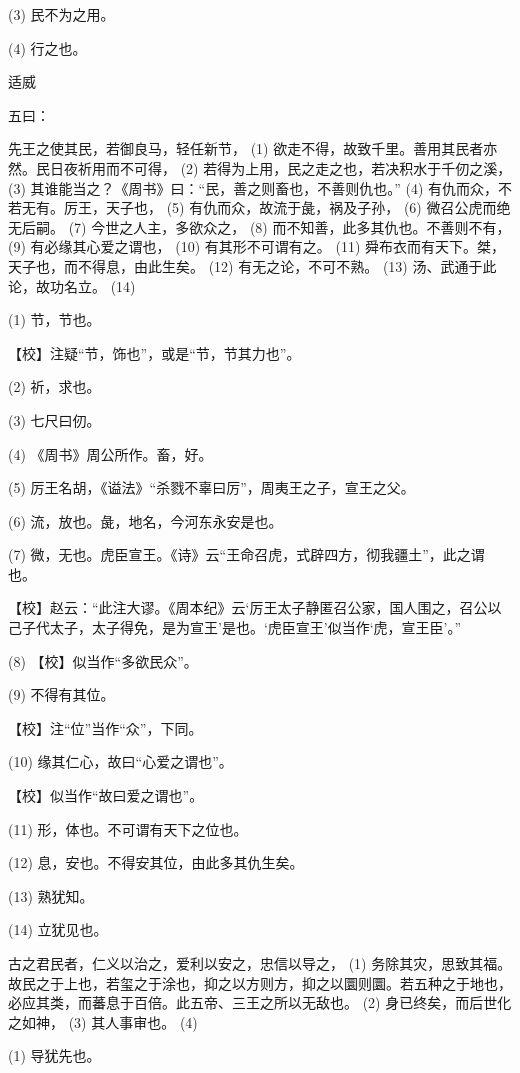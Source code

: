 \documentclass[12pt,UTF8]{ctexbook}
\begin{document}
(3) 民不为之用。

(4) 行之也。





适威


五曰：

先王之使其民，若御良马，轻任新节， (1) 欲走不得，故致千里。善用其民者亦然。民日夜祈用而不可得， (2) 若得为上用，民之走之也，若决积水于千仞之溪， (3) 其谁能当之？《周书》曰：“民，善之则畜也，不善则仇也。” (4) 有仇而众，不若无有。厉王，天子也， (5) 有仇而众，故流于彘，祸及子孙， (6) 微召公虎而绝无后嗣。 (7) 今世之人主，多欲众之， (8) 而不知善，此多其仇也。不善则不有， (9) 有必缘其心爱之谓也， (10) 有其形不可谓有之。 (11) 舜布衣而有天下。桀，天子也，而不得息，由此生矣。 (12) 有无之论，不可不熟。 (13) 汤、武通于此论，故功名立。 (14)

(1) 节，节也。

【校】注疑“节，饰也”，或是“节，节其力也”。

(2) 祈，求也。

(3) 七尺曰仞。

(4) 《周书》周公所作。畜，好。

(5) 厉王名胡，《谥法》“杀戮不辜曰厉”，周夷王之子，宣王之父。

(6) 流，放也。彘，地名，今河东永安是也。

(7) 微，无也。虎臣宣王。《诗》云“王命召虎，式辟四方，彻我疆土”，此之谓也。

【校】赵云：“此注大谬。《周本纪》云‘厉王太子静匿召公家，国人围之，召公以己子代太子，太子得免，是为宣王’是也。‘虎臣宣王’似当作‘虎，宣王臣’。”

(8) 【校】似当作“多欲民众”。

(9) 不得有其位。

【校】注“位”当作“众”，下同。

(10) 缘其仁心，故曰“心爱之谓也”。

【校】似当作“故曰爱之谓也”。

(11) 形，体也。不可谓有天下之位也。

(12) 息，安也。不得安其位，由此多其仇生矣。

(13) 熟犹知。

(14) 立犹见也。

古之君民者，仁义以治之，爱利以安之，忠信以导之， (1) 务除其灾，思致其福。故民之于上也，若玺之于涂也，抑之以方则方，抑之以圜则圜。若五种之于地也，必应其类，而蕃息于百倍。此五帝、三王之所以无敌也。 (2) 身已终矣，而后世化之如神， (3) 其人事审也。 (4)

(1) 导犹先也。
\end{document}
